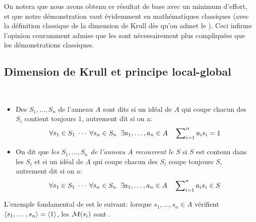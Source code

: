 On notera que nous avons obtenu ce résultat de base avec un minimum 
d'effort, et que notre démonstration vaut évidemment en mathématiques 
classiques (avec la définition classique de la dimension de Krull dès 
qu'on admet le \tcg). Ceci infirme l'opi\-nion couramment admise que les 
\prcos sont nécessairement plus compliquées que les démonstrations 
classiques.
\subsection{Dimension de Krull et principe local-global} 
\label{subsecKrLocGlob}
\begin{definition}  
\label{def.moco}{\rm ~
\begin{itemize}
\item [$(1)$] Des \mos $S_1,\ldots ,S_n$ de l'anneau $A$ sont dits
 {\em \com} si un idéal de $A$ qui coupe chacun des $S_i$ contient
 toujours $1$, autrement dit si on a:
$$ \forall s_1\in S_1 \;\cdots\; \forall s_n\in S_n \;\; 
\exists a_1,\ldots, a_n\in A\quad \sum\nolimits_{i=1}^{n} a_i s_i =1
$$
\item [$(2)$] On dit que 
{\em les \mos $S_1,\ldots ,S_n$ de l'anneau $A$ recouvrent le \mo $S$} 
si $S$ est contenu dans les $S_i$ et si un idéal de $A$ qui coupe 
chacun des $S_i$  coupe toujours $S$, autrement dit si on a:
$$ \forall s_1\in S_1 \;\cdots\; \forall s_n\in S_n \;\; 
\exists a_1,\ldots, a_n\in A\quad \sum\nolimits_{i=1}^{n} a_i s_i \in S
$$
\end{itemize}
}
\end{definition}



L'exemple fondamental de \moco est le suivant:
 lorsque $s_1,\ldots, s_n\in A$ vérifient 
$\left\langle{s_1,\ldots, s_n}\right\rangle=\left\langle{1}\right\rangle$,  les \mos ${\cal M}(s_i)$ sont \com.

